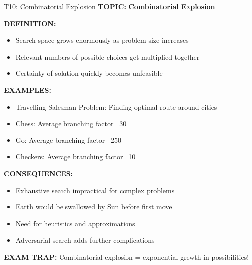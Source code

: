 \documentclass[8pt]{beamer}
\begin{document}
	\begin{frame}{T10: Combinatorial Explosion}
		\fontsize{6.5}{7.5}\selectfont
		\textbf{TOPIC: Combinatorial Explosion}
		
		\vspace{0.1cm}
		\textbf{DEFINITION:}
		\begin{itemize}
			\item Search space grows enormously as problem size increases
			\item Relevant numbers of possible choices get multiplied together
			\item Certainty of solution quickly becomes unfeasible
		\end{itemize}
		
		\vspace{0.1cm}
		\textbf{EXAMPLES:}
		\begin{itemize}
			\item \textcolor{myblue}{Travelling Salesman Problem:} Finding optimal route around cities
			\item \textcolor{myblue}{Chess:} Average branching factor ~30
			\item \textcolor{myblue}{Go:} Average branching factor ~250
			\item \textcolor{myblue}{Checkers:} Average branching factor ~10
		\end{itemize}
		
		\vspace{0.1cm}
		\textbf{CONSEQUENCES:}
		\begin{itemize}
			\item Exhaustive search impractical for complex problems
			\item Earth would be swallowed by Sun before first move
			\item Need for heuristics and approximations
			\item Adversarial search adds further complications
		\end{itemize}
		
		\textcolor{myred}{\textbf{EXAM TRAP:}} Combinatorial explosion = \textcolor{myblue}{exponential growth in possibilities}!
	\end{frame}
	
\end{document}
